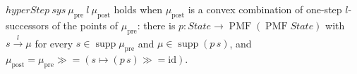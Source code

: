 \begin{definition}
  \label{def:hyperstep}
  \leanok
  $hyperStep\ sys\ \mu_{\mathrm{pre}}\ l\ \mu_{\mathrm{post}}$ holds when
  $\mu_{\mathrm{post}}$ is a convex combination of one-step $l$-successors of the
  points of $\mu_{\mathrm{pre}}$: there is $p : State \to \operatorname{PMF}(\operatorname{PMF} State)$
  with $s \xrightarrow{l} \mu$ for every $s \in \operatorname{supp}\mu_{\mathrm{pre}}$
  and $\mu \in \operatorname{supp}(p\,s)$, and
  $\mu_{\mathrm{post}} = \mu_{\mathrm{pre}} \mathbin{\gg\!=} (s \mapsto (p\,s)\mathbin{\gg\!=}\mathrm{id})$.
\end{definition}

